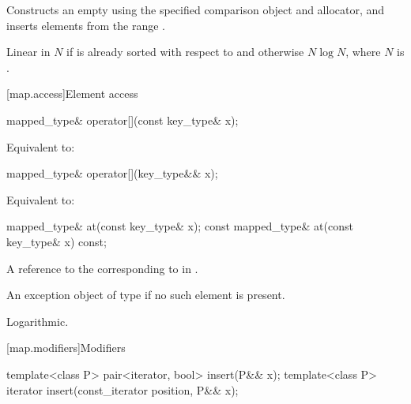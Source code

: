 \begin{itemdescr}
\pnum
\effects
Constructs an empty 
using the specified comparison object and allocator,
and inserts elements from the range .

\pnum
\complexity
Linear in $N$ if  is already sorted with respect to  and
otherwise $N \log N$, where $N$ is .
\end{itemdescr}

[map.access]{Element access}

%
\begin{itemdecl}
mapped_type& operator[](const key_type& x);
\end{itemdecl}

\begin{itemdescr}
\pnum
\effects
Equivalent to: 
\end{itemdescr}

%
\begin{itemdecl}
mapped_type& operator[](key_type&& x);
\end{itemdecl}

\begin{itemdescr}
\pnum
\effects
Equivalent to: 
\end{itemdescr}

%
\begin{itemdecl}
mapped_type&       at(const key_type& x);
const mapped_type& at(const key_type& x) const;
\end{itemdecl}

\begin{itemdescr}
\pnum
\returns
A reference to the  corresponding to  in .

\pnum
\throws
An exception object of type  if
no such element is present.

\pnum
\complexity
Logarithmic.
\end{itemdescr}

[map.modifiers]{Modifiers}

%
\begin{itemdecl}
template<class P>
  pair<iterator, bool> insert(P&& x);
template<class P>
  iterator insert(const_iterator position, P&& x);
\end{itemdecl}

